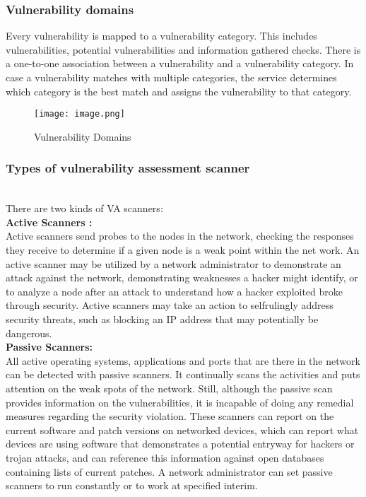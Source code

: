 \documentclass[conference]{IEEEtran}
\begin{document}
\subsubsection{Vulnerability domains}
Every vulnerability is mapped to a vulnerability category. This includes vulnerabilities, potential vulnerabilities and information gathered checks. There is a one-to-one association between a vulnerability and a vulnerability category. In case a vulnerability matches with multiple categories, the service determines which category is the best match and assigns the vulnerability to that category.

\begin{figure}[h]
    \centering
    \texttt{[image: image.png]}
    \caption{Vulnerability Domains}
\end{figure}

\subsubsection{Types of vulnerability assessment scanner}
\\There are two kinds of VA scanners:
\\\textbf{Active Scanners :} \\Active scanners send probes to the nodes in the network, checking the responses they receive to determine if a given node is a weak point within the net work. An active scanner may be utilized by a network administrator to demonstrate an attack against the network, demonstrating weaknesses a hacker might identify, or to analyze a node after an attack to understand how a hacker exploited broke through security. Active scanners may take an action to selfrulingly address security threats, such as blocking an IP address that may potentially be dangerous.
\\\textbf{Passive Scanners: }\\All active operating systems, applications and ports that are there in the network can be detected with passive scanners. It continually scans the activities and puts attention on the weak spots of the network. Still, although the passive scan provides information on the vulnerabilities, it is incapable of doing any remedial measures regarding the security violation. These scanners can report on the current software and patch versions on networked devices, which can report what devices are using software that demonstrates a potential entryway for hackers or trojan attacks, and can reference this information against open databases containing lists of current patches. A network administrator can set passive scanners to run constantly or to work at specified interim.
\end{document}
